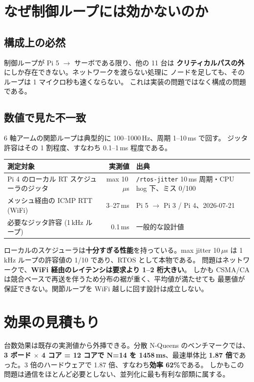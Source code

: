 \documentclass[11pt,a4paper]{article}
\newcommand{\code}[1]{\texttt{#1}}
\newcommand{\prob}[1]{\textbf{\textcolor{red!55!black}{#1}}}
\newcommand{\good}[1]{\textbf{\textcolor{green!45!black}{#1}}}
\begin{document}
\section{なぜ制御ループには効かないのか}

\subsection{構成上の必然}

制御ループが Pi 5 $\rightarrow$ サーボである限り、他の 11 台は
\textbf{クリティカルパスの外}にしか存在できない。ネットワークを渡らない処理に
ノードを足しても、そのループは 1 マイクロ秒も速くならない。
これは実装の問題ではなく構成の問題である。

\subsection{数値で見た不一致}

6 軸アームの関節ループは典型的に 100--1000\,Hz、周期 1--10\,ms で回す。
ジッタ許容はその 1 割程度、すなわち 0.1--1\,ms 程度である。

\begin{center}
\begin{tabular}{@{}l r l@{}}
\toprule
\textbf{測定対象} & \textbf{実測値} & \textbf{出典}\\
\midrule
Pi 4 のローカル RT スケジューラのジッタ & max 10\,$\mu$s & \code{/rtos-jitter} 10\,ms 周期・CPU hog 下、ミス 0/100\\
メッシュ経由の ICMP RTT (WiFi) & 3--27\,ms & Pi 5 $\rightarrow$ Pi 3 / Pi 4、2026-07-21\\
必要なジッタ許容 (1\,kHz ループ) & 0.1\,ms & 一般的な設計値\\
\bottomrule
\end{tabular}
\end{center}

ローカルのスケジューラは\good{十分すぎる性能}を持っている。max jitter 10\,$\mu$s は
1\,kHz ループの許容値の 1/10 であり、RTOS として本物である。
問題はネットワークで、\prob{WiFi 経由のレイテンシは要求より 1--2 桁大きい}。
しかも CSMA/CA は競合ベースで再送を伴うため分布の裾が重く、平均値が満たせても
最悪値が保証できない。関節ループを WiFi 越しに回す設計は成立しない。

\section{効果の見積もり}

台数効果は既存の実測値から外挿できる。分散 N-Queens のベンチマークでは、
\textbf{3 ボード $\times$ 4 コア = 12 コアで N=14 を 1458\,ms}、最速単体比
\textbf{1.87 倍}であった。3 倍のハードウェアで 1.87 倍、すなわち\textbf{効率 62\%}である。
しかもこの問題は通信をほとんど必要としない、並列化に最も有利な部類に属する。
\end{document}
